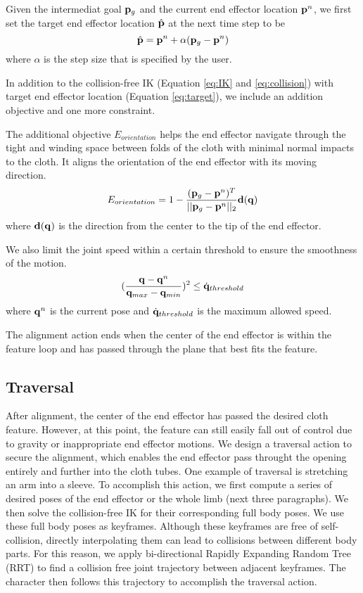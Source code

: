 Given the intermediat goal $\mathbf{p}_g$ and the current end effector location $\mathbf{p}^n$, we first set the target end effector location $\hat{\mathbf{p}}$ at the next time step to be 
\begin{equation}
  \hat{\mathbf{p}} = \mathbf{p}^n+\alpha(\mathbf{p}_g - \mathbf{p}^n)
  \label{eq:target}
\end{equation}
where $\alpha$ is the step size that is specified by the user.

In addition to the collision-free IK (Equation \ref{eq:IK} and \ref{eq:collision}) with target end effector location (Equation \ref{eq:target}), we include an addition objective and one more constraint.

The additional objective $E_{orientation}$ helps the end effector navigate through the tight and winding space between folds of the cloth with minimal normal impacts to the cloth. It aligns the orientation of the end effector with its moving direction.
\begin{displaymath}
E_{orientation} = 1-\frac{(\mathbf{p}_g-\mathbf{p}^n)^T}{||\mathbf{p}_g-\mathbf{p}^n||_2}\mathbf{d(q})
\end{displaymath}
where $\mathbf{d(q)}$ is the direction from the center to the tip of the end effector.

We also limit the joint speed within a certain threshold to ensure the smoothness of the motion.
\begin{displaymath}
(\frac{\mathbf{q} - \mathbf{q}^n}{\mathbf{q}_{max}-\mathbf{q}_{min}})^2 \leq \dot{\mathbf{q}}_{threshold}
\end{displaymath}
where $\mathbf{q}^n$ is the current pose and $\dot{\mathbf{q}}_{threshold}$ is the maximum allowed speed.

The alignment action ends when the center of the end effector is within the feature loop and has passed through the plane that best fits the feature.

\subsection{Traversal}
After alignment, the center of the end effector has passed the desired cloth feature. However, at this point, the feature can still easily fall out of control due to gravity or inappropriate end effector motions. We design a traversal action to secure the alignment, which enables the end effector pass throught the opening entirely and further into the cloth tubes. One example of traversal is stretching an arm into a sleeve. To accomplish this action, we first compute a series of desired poses of the end effector or the whole limb (next three paragraphs). We then solve the collision-free IK for their corresponding full body poses. We use these full body poses as keyframes. Although these keyframes are free of self-collision, directly interpolating them can lead to collisions between different body parts. For this reason, we apply bi-directional Rapidly Expanding Random Tree (RRT) \cite{} to find a collision free joint trajectory between adjacent keyframes. The character then follows this trajectory to accomplish the traversal action.

